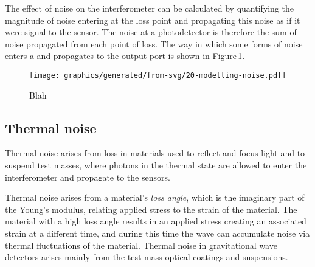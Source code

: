 The effect of noise on the interferometer can be calculated by quantifying the magnitude of noise entering at the loss point and propagating this noise as if it were signal to the sensor. The noise at a photodetector is therefore the sum of noise propagated from each point of loss. The way in which some forms of noise enters a \DRFPMI{} and propagates to the output port is shown in Figure\,\ref{fig:modelling-noise}.

\begin{figure}
  \centering
  \texttt{[image: graphics/generated/from-svg/20-modelling-noise.pdf]}
  \caption[Modelling noise]{\label{fig:modelling-noise}Blah}
\end{figure}

\subsection{Thermal noise}
Thermal noise arises from loss in materials used to reflect and focus light and to suspend test masses, where photons in the thermal state are allowed to enter the interferometer and propagate to the sensors.

Thermal noise arises from a material's \emph{loss angle}, which is the imaginary part of the Young's modulus, relating applied stress to the strain of the material. The material with a high loss angle results in an applied stress creating an associated strain at a different time, and during this time the wave can accumulate noise via thermal fluctuations of the material. Thermal noise in gravitational wave detectors arises mainly from the test mass optical coatings and suspensions.

